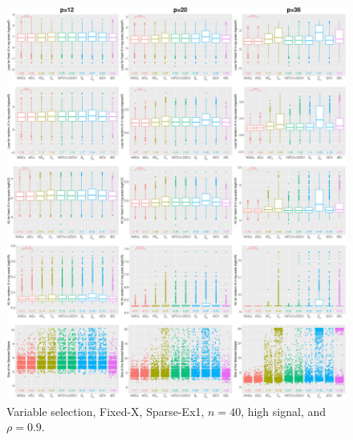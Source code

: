 \begin{figure}[!ht]
\centering
\includegraphics[width=\textwidth]{figures/supplement/fixedx/subset_selection/Sparse-Ex1_n40_hsnr_rho09.eps}
\caption{Variable selection, Fixed-X, Sparse-Ex1, $n=40$, high signal, and $\rho=0.9$.}
\end{figure}
\clearpage
